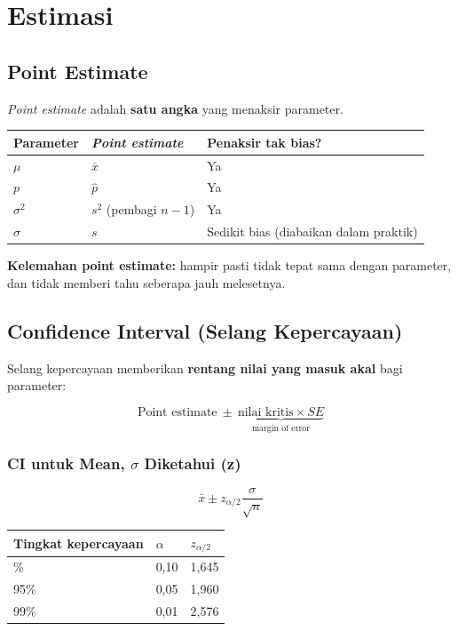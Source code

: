 \documentclass[
  indonesian,
  letterpaper,
]{book}
\newcounter{none} %
\begin{document}
\section{Estimasi}\label{estimasi}

\subsection{Point Estimate}\label{point-estimate}

\emph{Point estimate} adalah \textbf{satu angka} yang menaksir
parameter.

{\def\LTcaptype{none} %
\begin{longtable}[]{@{}lll@{}}
\toprule\noalign{}
Parameter & \emph{Point estimate} & Penaksir tak bias? \\
\midrule\noalign{}
\endhead
\bottomrule\noalign{}
\endlastfoot
\(\mu\) & \(\bar{x}\) & Ya \\
\(p\) & \(\hat{p}\) & Ya \\
\(\sigma^2\) & \(s^2\) (pembagi \(n-1\)) & Ya \\
\(\sigma\) & \(s\) & Sedikit bias (diabaikan dalam praktik) \\
\end{longtable}
}

\textbf{Kelemahan point estimate:} hampir pasti tidak tepat sama dengan
parameter, dan tidak memberi tahu seberapa jauh melesetnya.

\subsection{Confidence Interval (Selang
Kepercayaan)}\label{confidence-interval-selang-kepercayaan}

Selang kepercayaan memberikan \textbf{rentang nilai yang masuk akal}
bagi parameter:

\[\text{Point estimate} \ \pm\ \underbrace{\text{nilai kritis} \times SE}_{\text{margin of error}}\]

\subsubsection{\texorpdfstring{CI untuk Mean, \(\sigma\) Diketahui
(z)}{CI untuk Mean, \textbackslash sigma Diketahui (z)}}\label{ci-untuk-mean-sigma-diketahui-z}

\[\bar{x} \pm z_{\alpha/2} \frac{\sigma}{\sqrt{n}}\]

{\def\LTcaptype{none} %
\begin{longtable}[]{@{}lll@{}}
\toprule\noalign{}
Tingkat kepercayaan & \(\alpha\) & \(z_{\alpha/2}\) \\
\midrule\noalign{}
\endhead
\bottomrule\noalign{}
\endlastfoot
90\% & 0,10 & 1,645 \\
95\% & 0,05 & 1,960 \\
99\% & 0,01 & 2,576 \\
\end{longtable}
}
\end{document}
